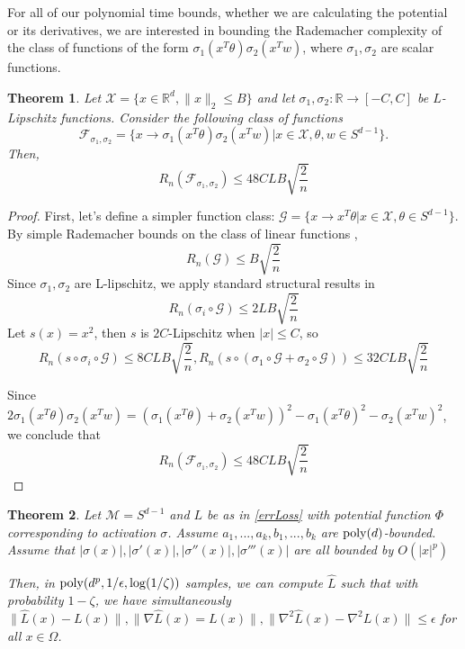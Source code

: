 \documentclass{article}
\newtheorem{theorem}{Theorem}[section]
\newcommand{\R}{{\mathbb{R}}}
\begin{document}
For all of our polynomial time bounds, whether we are calculating the potential or its derivatives, we are interested in bounding the Rademacher complexity of the class of functions of the form $\sigma_1(x^T\theta) \sigma_2(x^Tw)$, where $\sigma_1,\sigma_2$ are scalar functions.
%
\begin{theorem}\label{complexity}
Let $\mathcal{X} = \{x \in \R^d, \|x\|_2\leq B\}$ and let $\sigma_1,\sigma_2 : \R \to [-C,C]$ be $L$-Lipschitz functions. Consider the following class of functions
%
\[\mathcal{F}_{\sigma_1,\sigma_2} = \{x\to\sigma_1(x^T\theta) \sigma_2(x^Tw) | x\in\mathcal{X}, \theta, w \in S^{d-1}\}.\]
Then, \[R_n(\mathcal{F}_{\sigma_1,\sigma_2}) \leq 48CLB\sqrt{\frac{2}{n}}\]
\end{theorem}
\begin{proof}
First, let's define a simpler function class: $\mathcal{G} = \{x\to x^T\theta  | x\in\mathcal{X}, \theta \in S^{d-1}\}$. By simple Rademacher bounds on the class of linear functions \cite{kakade2009complexity}, 
 \[R_n(\mathcal{G}) \leq B\sqrt{\frac{2}{n}}\]
%
Since $\sigma_1,\sigma_2$ are L-lipschitz, we apply standard structural results in \cite{bartlett2002rademacher}
%
\[R_n(\sigma_i\circ \mathcal{G}) \leq 2LB\sqrt{\frac{2}{n}}\]
%
Let $s(x) = x^2$, then $s$ is $2C$-Lipschitz when $|x|\leq C$, so 
%
\[R_n(s\circ \sigma_i\circ\mathcal{G}) \leq 8CLB\sqrt{\frac{2}{n}},
R_n(s\circ(\sigma_1\circ \mathcal{G} +\sigma_2\circ \mathcal{G})) \leq
32 CLB\sqrt{\frac{2}{n}}\]
 
Since $2\sigma_1(x^T\theta)\sigma_2(x^Tw) = (\sigma_1(x^T\theta)+\sigma_2(x^Tw))^2 - \sigma_1(x^T\theta)^2 - \sigma_2(x^Tw)^2$, we conclude that 
\[R_n (\mathcal{F}_{\sigma_1,\sigma_2}) \leq 48CLB\sqrt{\frac{2}{n}}\]
\end{proof}

\begin{theorem}
\label{genErrBound}
Let $\mathcal{M} = S^{d-1}$ and $L$ be as in \ref{errLoss} with potential function $\Phi$ corresponding to activation $\sigma$. Assume $a_1,...,a_k,b_1,...,b_k$ are $\mathrm{poly}(d)$-bounded. Assume that $|\sigma(x)|, |\sigma'(x)|,|\sigma''(x)|, |\sigma'''(x)|$ are all bounded by $O(|x|^p)$  

Then, in $\mathrm{poly}(d^p, 1/\epsilon, \log(1/\zeta))$ samples, we can compute $\hat{L}$ such that with probability $1-\zeta$, we have simultaneously $\|\widehat{L}(x) -L(x)\|, \|\nabla \widehat{L}(x) = L(x)\|, \|\nabla^2\widehat{L}(x) -\nabla^2 L(x)\| \leq \epsilon$ for all $x\in \Omega$.
\end{theorem}
\end{document}
